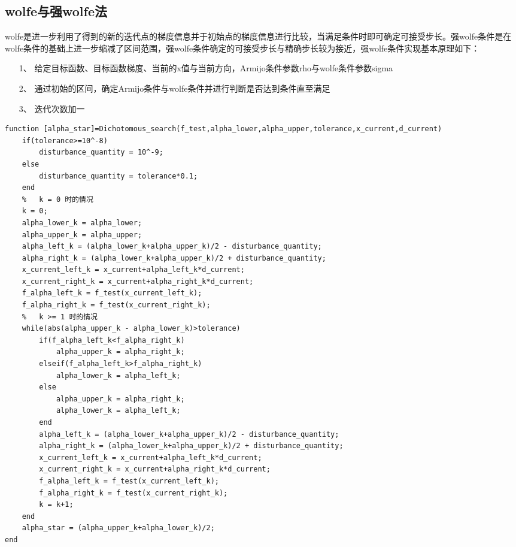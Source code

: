 \subsection{wolfe与强wolfe法}
wolfe是进一步利用了得到的新的迭代点的梯度信息并于初始点的梯度信息进行比较，当满足条件时即可确定可接受步长。强wolfe条件是在wolfe条件的基础上进一步缩减了区间范围，强wolfe条件确定的可接受步长与精确步长较为接近，强wolfe条件实现基本原理如下：

\begin{itemize}
    \item[1、] 给定目标函数、目标函数梯度、当前的x值与当前方向，Armijo条件参数rho与wolfe条件参数sigma
    \item[2、] 通过初始的区间，确定Armijo条件与wolfe条件并进行判断是否达到条件直至满足
    \item[3、] 迭代次数加一
\end{itemize}

\newpage
\begin{lstlisting}[style=matlab, title="对分搜索方法代码"]
function [alpha_star]=Dichotomous_search(f_test,alpha_lower,alpha_upper,tolerance,x_current,d_current)
    if(tolerance>=10^-8)
        disturbance_quantity = 10^-9;
    else
        disturbance_quantity = tolerance*0.1;
    end
    %   k = 0 时的情况
    k = 0;
    alpha_lower_k = alpha_lower;
    alpha_upper_k = alpha_upper;
    alpha_left_k = (alpha_lower_k+alpha_upper_k)/2 - disturbance_quantity;
    alpha_right_k = (alpha_lower_k+alpha_upper_k)/2 + disturbance_quantity;
    x_current_left_k = x_current+alpha_left_k*d_current;
    x_current_right_k = x_current+alpha_right_k*d_current;
    f_alpha_left_k = f_test(x_current_left_k);
    f_alpha_right_k = f_test(x_current_right_k);
    %   k >= 1 时的情况
    while(abs(alpha_upper_k - alpha_lower_k)>tolerance)
        if(f_alpha_left_k<f_alpha_right_k)
            alpha_upper_k = alpha_right_k;
        elseif(f_alpha_left_k>f_alpha_right_k)
            alpha_lower_k = alpha_left_k;
        else
            alpha_upper_k = alpha_right_k;
            alpha_lower_k = alpha_left_k;
        end
        alpha_left_k = (alpha_lower_k+alpha_upper_k)/2 - disturbance_quantity;
        alpha_right_k = (alpha_lower_k+alpha_upper_k)/2 + disturbance_quantity;
        x_current_left_k = x_current+alpha_left_k*d_current;
        x_current_right_k = x_current+alpha_right_k*d_current;
        f_alpha_left_k = f_test(x_current_left_k);
        f_alpha_right_k = f_test(x_current_right_k);
        k = k+1;
    end
    alpha_star = (alpha_upper_k+alpha_lower_k)/2;
end
\end{lstlisting}

